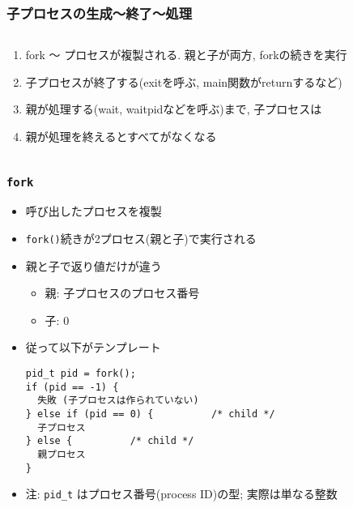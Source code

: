 \documentclass[12pt,dvipdfmx]{beamer}
\begin{document}
\begin{frame}
\frametitle{子プロセスの生成〜終了〜処理}
\begin{columns}
  \begin{column}{0.5\textwidth}
    \begin{enumerate}
    \item<3-> fork 〜 プロセスが複製される. 親と子が両方, forkの続きを実行
    \item<4-> 子プロセスが終了する(exitを呼ぶ, main関数がreturnするなど)
    \item<5-> 親が処理する(wait, waitpidなどを呼ぶ)まで,
      子プロセスは
    \item<6-> 親が処理を終えるとすべてがなくなる
    \end{enumerate}
  \end{column}
  \begin{column}{0.5\textwidth}
\begin{center}
%
%
%
%
%
\end{center}
  \end{column}
\end{columns}
\end{frame}

\begin{frame}[fragile]
\frametitle{{\tt fork}}
\begin{itemize}
\item 呼び出したプロセスを複製
\item {\tt fork()}続きが2プロセス(親と子)で実行される
\item 親と子で返り値だけが違う
  \begin{itemize}
  \item 親: 子プロセスのプロセス番号
  \item 子: 0
  \end{itemize}
\item 従って以下がテンプレート
\begin{lstlisting}
pid_t pid = fork();
if (pid == -1) {
  失敗 (子プロセスは作られていない)
} else if (pid == 0) {          /* child */
  子プロセス
} else {          /* child */
  親プロセス
}
\end{lstlisting}
\item 注: {\tt pid\_t} はプロセス番号(process ID)の型; 実際は単なる整数
\end{itemize}
\end{frame}
\end{document}

